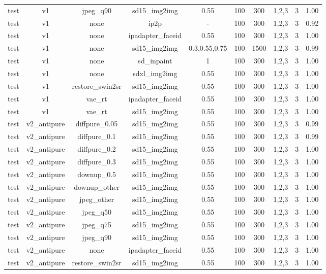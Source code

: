 \begin{table}[t]
{\begin{tabular}{lccccccccc}
test & v1 & jpeg\_q90 & sd15\_img2img & 0.55 & 100 & 300 & 1,2,3 & 3 & 1.00 \\
test & v1 & none & ip2p & - & 100 & 300 & 1,2,3 & 3 & 0.92 \\
test & v1 & none & ipadapter\_faceid & 0.55 & 100 & 300 & 1,2,3 & 3 & 1.00 \\
test & v1 & none & sd15\_img2img & 0.3,0.55,0.75 & 100 & 1500 & 1,2,3 & 3 & 0.99 \\
test & v1 & none & sd\_inpaint & 1 & 100 & 300 & 1,2,3 & 3 & 1.00 \\
test & v1 & none & sdxl\_img2img & 0.55 & 100 & 300 & 1,2,3 & 3 & 1.00 \\
test & v1 & restore\_swin2sr & sd15\_img2img & 0.55 & 100 & 300 & 1,2,3 & 3 & 1.00 \\
test & v1 & vae\_rt & ipadapter\_faceid & 0.55 & 100 & 300 & 1,2,3 & 3 & 1.00 \\
test & v1 & vae\_rt & sd15\_img2img & 0.55 & 100 & 300 & 1,2,3 & 3 & 1.00 \\
test & v2\_antipure & diffpure\_0.05 & sd15\_img2img & 0.55 & 100 & 300 & 1,2,3 & 3 & 0.99 \\
test & v2\_antipure & diffpure\_0.1 & sd15\_img2img & 0.55 & 100 & 300 & 1,2,3 & 3 & 0.99 \\
test & v2\_antipure & diffpure\_0.2 & sd15\_img2img & 0.55 & 100 & 300 & 1,2,3 & 3 & 1.00 \\
test & v2\_antipure & diffpure\_0.3 & sd15\_img2img & 0.55 & 100 & 300 & 1,2,3 & 3 & 1.00 \\
test & v2\_antipure & downup\_0.5 & sd15\_img2img & 0.55 & 100 & 300 & 1,2,3 & 3 & 1.00 \\
test & v2\_antipure & downup\_other & sd15\_img2img & 0.55 & 100 & 300 & 1,2,3 & 3 & 1.00 \\
test & v2\_antipure & jpeg\_other & sd15\_img2img & 0.55 & 100 & 300 & 1,2,3 & 3 & 1.00 \\
test & v2\_antipure & jpeg\_q50 & sd15\_img2img & 0.55 & 100 & 300 & 1,2,3 & 3 & 1.00 \\
test & v2\_antipure & jpeg\_q75 & sd15\_img2img & 0.55 & 100 & 300 & 1,2,3 & 3 & 1.00 \\
test & v2\_antipure & jpeg\_q90 & sd15\_img2img & 0.55 & 100 & 300 & 1,2,3 & 3 & 1.00 \\
test & v2\_antipure & none & ipadapter\_faceid & 0.55 & 100 & 300 & 1,2,3 & 3 & 1.00 \\
test & v2\_antipure & restore\_swin2sr & sd15\_img2img & 0.55 & 100 & 300 & 1,2,3 & 3 & 1.00 \\

\end{tabular}}
\end{table}
